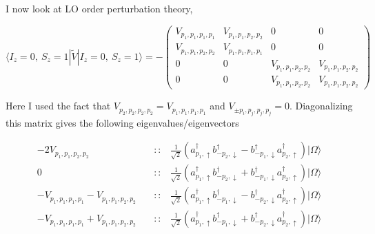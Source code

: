 \documentclass[
  letterpaper,
  DIV=11,
  numbers=noendperiod]{scrartcl}
\begin{document}
I now look at LO order perturbation theory,

\begin{equation}
\langle I_z=0,\ S_z=1|\tilde V|I_z=0,\ S_z=1\rangle=-
\begin{pmatrix}
V_{p_1,p_1,p_1,p_1} & V_{p_1,p_1,p_2,p_2} & 0 & 0\\
V_{p_1,p_1,p_2,p_2} & V_{p_1,p_1,p_1,p_1} & 0 & 0\\
0 & 0 & V_{p_1,p_1,p_2,p_2} & V_{p_1,p_1,p_2,p_2}\\
0 & 0 & V_{p_1,p_1,p_2,p_2} & V_{p_1,p_1,p_2,p_2}
\end{pmatrix}
\end{equation}

Here I used the fact that \(V_{p_2,p_2,p_2,p_2}=V_{p_1,p_1,p_1,p_1}\)
and \(V_{\pm p_i,p_j,p_j,p_j}=0\). Diagonalizing this matrix gives the
following eigenvalues/eigenvectors

\begin{tcolorbox}[enhanced jigsaw, arc=.35mm, bottomrule=.15mm, bottomtitle=1mm, breakable, colback=white, colbacktitle=quarto-callout-note-color!10!white, colframe=quarto-callout-note-color-frame, coltitle=black, left=2mm, leftrule=.75mm, opacityback=0, opacitybacktitle=0.6, rightrule=.15mm, title=\textcolor{quarto-callout-note-color}{\faInfo}\hspace{0.5em}{\(I_z=0,\ S_z=1\)}, titlerule=0mm, toprule=.15mm, toptitle=1mm]

\begin{align}
-2V_{p_1,p_1,p_2,p_2} &\quad :: & \frac{1}{\sqrt{2}}\left(a^\dagger_{p_1,\uparrow}b^\dagger_{-p_2,\downarrow}-b^\dagger_{-p_1,\downarrow}a^\dagger_{p_2,\uparrow}\right)|\Omega\rangle\\
0 &\quad :: &  \frac{1}{\sqrt{2}}\left(a^\dagger_{p_1,\uparrow}b^\dagger_{-p_2,\downarrow}+b^\dagger_{-p_1,\downarrow}a^\dagger_{p_2,\uparrow}\right)|\Omega\rangle\\
-V_{p_1,p_1,p_1,p_1}-V_{p_1,p_1,p_2,p_2} &\quad :: & \frac{1}{\sqrt{2}}\left(a^\dagger_{p_1,\uparrow}b^\dagger_{-p_1,\downarrow}-b^\dagger_{-p_2,\downarrow}a^\dagger_{p_2,\uparrow}\right)|\Omega\rangle\\
-V_{p_1,p_1,p_1,p_1}+V_{p_1,p_1,p_2,p_2} &\quad :: & \frac{1}{\sqrt{2}}\left(a^\dagger_{p_1,\uparrow}b^\dagger_{-p_1,\downarrow}+b^\dagger_{-p_2,\downarrow}a^\dagger_{p_2,\uparrow}\right)|\Omega\rangle
\end{align}

\end{tcolorbox}
\end{document}
